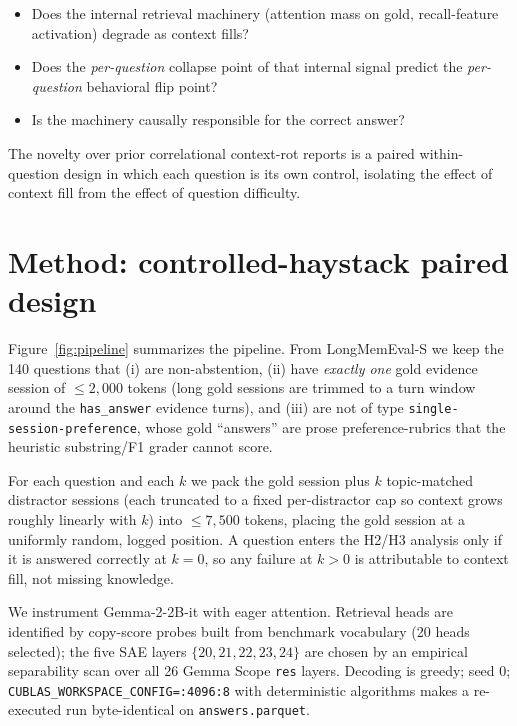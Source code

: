 \documentclass[10pt,twocolumn]{article}
\newcommand{\kof}[1]{k\!=\!#1}
\begin{document}
\begin{itemize}\itemsep2pt
  \item[\textbf{H1}] Does the internal retrieval machinery (attention mass on
  gold, recall-feature activation) degrade as context fills?
  \item[\textbf{H2}] Does the \emph{per-question} collapse point of that internal
  signal predict the \emph{per-question} behavioral flip point?
  \item[\textbf{H3}] Is the machinery causally responsible for the correct answer?
\end{itemize}

The novelty over prior correlational context-rot reports is a paired
within-question design in which each question is its own control, isolating the
effect of context fill from the effect of question difficulty.

\section{Method: controlled-haystack paired design}
\label{sec:method}
Figure~\ref{fig:pipeline} summarizes the pipeline. From LongMemEval-S we keep the
140 questions that (i) are non-abstention, (ii) have \emph{exactly one} gold
evidence session of $\le 2{,}000$ tokens (long gold sessions are trimmed to a
turn window around the \texttt{has\_answer} evidence turns), and (iii) are not
of type \texttt{single-session-preference}, whose gold ``answers'' are
prose preference-rubrics that the heuristic substring/F1 grader cannot score.

For each question and each $k$ we pack the gold session plus $k$ topic-matched
distractor sessions (each truncated to a fixed per-distractor cap so context
grows roughly linearly with $k$) into $\le 7{,}500$ tokens, placing the gold
session at a uniformly random, logged position. A question enters the H2/H3
analysis only if it is answered correctly at $\kof{0}$, so any failure at
$k>0$ is attributable to context fill, not missing knowledge.

We instrument Gemma-2-2B-it with eager attention. Retrieval heads are identified
by copy-score probes built from benchmark vocabulary (20 heads selected); the
five SAE layers $\{20,21,22,23,24\}$ are chosen by an empirical separability scan
over all 26 Gemma Scope \texttt{res} layers. Decoding is greedy; seed $0$;
\texttt{CUBLAS\_WORKSPACE\_CONFIG=:4096:8} with deterministic algorithms makes a
re-executed run byte-identical on \texttt{answers.parquet}.
\end{document}
